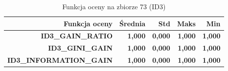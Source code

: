 \begin{table}[htbp]
\centering
\small
\setlength{\tabcolsep}{6pt}
\renewcommand{\arraystretch}{1.2}
\caption{Funkcja oceny na zbiorze 73 (ID3)}
\label{tab:ID3_eval_function_73}
\begin{tabular}{r|r|r|r|r}
\toprule
Funkcja oceny & Średnia & Std & Maks & Min \\
\hline
\textbf{ID3\_GAIN\_RATIO} & \textbf{1,000} & \textbf{0,000} & \textbf{1,000} & \textbf{1,000} \\
\textbf{ID3\_GINI\_GAIN} & \textbf{1,000} & \textbf{0,000} & \textbf{1,000} & \textbf{1,000} \\
\textbf{ID3\_INFORMATION\_GAIN} & \textbf{1,000} & \textbf{0,000} & \textbf{1,000} & \textbf{1,000} \\
\bottomrule
\end{tabular}
\end{table}